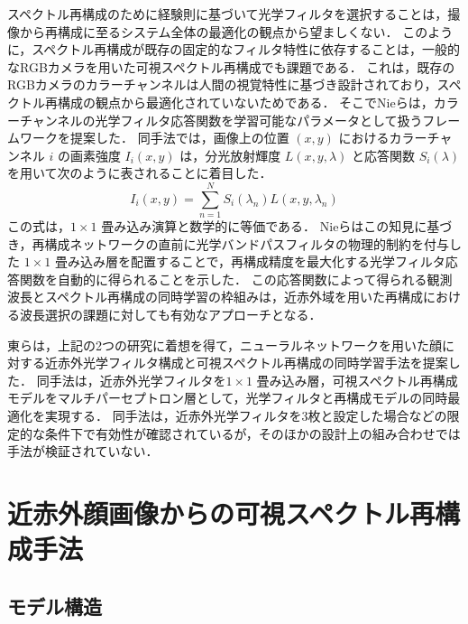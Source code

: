 \documentclass[MIRU,submit]{miru2026j}
\begin{document}
スペクトル再構成のために経験則に基づいて光学フィルタを選択することは，撮像から再構成に至るシステム全体の最適化の観点から望ましくない．
このように，スペクトル再構成が既存の固定的なフィルタ特性に依存することは，一般的なRGBカメラを用いた可視スペクトル再構成でも課題である．
これは，既存のRGBカメラのカラーチャンネルは人間の視覚特性に基づき設計されており，スペクトル再構成の観点から最適化されていないためである．
そこでNieらは，カラーチャンネルの光学フィルタ応答関数を学習可能なパラメータとして扱うフレームワークを提案した\cite{proc:nie}．
同手法では，画像上の位置 $(x, y)$ におけるカラーチャンネル $i$ の画素強度 $I_i(x, y)$ は，分光放射輝度 $L(x, y, \lambda)$ と応答関数 $S_i(\lambda)$ を用いて次のように表されることに着目した．
\begin{equation}
I_i(x, y) = \sum_{n=1}^{N} S_i(\lambda_n)L(x, y, \lambda_n) \label{eq:nie2}
\end{equation}
この式は，$1 \times 1$ 畳み込み演算と数学的に等価である．
Nieらはこの知見に基づき，再構成ネットワークの直前に光学バンドパスフィルタの物理的制約を付与した $1 \times 1$ 畳み込み層を配置することで，再構成精度を最大化する光学フィルタ応答関数を自動的に得られることを示した．
この応答関数によって得られる観測波長とスペクトル再構成の同時学習の枠組みは，近赤外域を用いた再構成における波長選択の課題に対しても有効なアプローチとなる．

東らは，上記の2つの研究に着想を得て，ニューラルネットワークを用いた顔に対する近赤外光学フィルタ構成と可視スペクトル再構成の同時学習手法を提案した\cite{proc:higashi}．
同手法は，近赤外光学フィルタを$1 \times 1$ 畳み込み層，可視スペクトル再構成モデルをマルチパーセプトロン層として，光学フィルタと再構成モデルの同時最適化を実現する．
同手法は，近赤外光学フィルタを3枚と設定した場合などの限定的な条件下で有効性が確認されているが，そのほかの設計上の組み合わせでは手法が検証されていない．


\section{近赤外顔画像からの可視スペクトル再構成手法}

\subsection{モデル構造}
\end{document}
